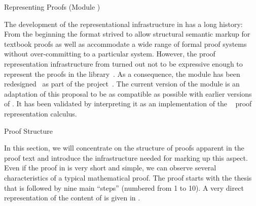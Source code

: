 \begin{omgroup}[id=proofs,short=Representing Proofs]{Representing Proofs (Module {})}
\begin{module}[id=proofs-intro]
The development of the representational infrastructure in \omdoc has a long history:
From the beginning the format strived to allow structural semantic markup for textbook
proofs as well as accommodate a wide range of formal proof systems without over-committing
to a particular system. However, the proof representation infrastructure from
{} turned out not to be expressive enough to represent the proofs in the
{} library~\cite{AspPad:hsmw01}. As a consequence, the {} module
has been redesigned~\cite{AspKohSac:dtdop03} as part of the {}
project~\cite{AspKoht:mimp02}.  The current version of the {} module is an
adaptation of this proposal to be as compatible as possible with earlier versions of
\omdoc. It has been validated by interpreting it as an implementation of the
{}~\cite{SacerdotiCoen:enlt05} proof
representation calculus.
\end{module}


\begin{module}[id=proof-structure]
\begin{omgroup}[id=proof-text]{Proof Structure}

In this section, we will concentrate on the structure of proofs apparent in the proof text
and introduce the \omdoc infrastructure needed for marking up this aspect. Even if the
proof in {} is very short and simple, we can observe several
characteristics of a typical mathematical proof.  The proof starts with the thesis that is
followed by nine main ``steps'' (numbered from 1 to 10). A very direct representation of
the content of {} is given in {}.


\end{omgroup}
\end{module}
\end{omgroup}
